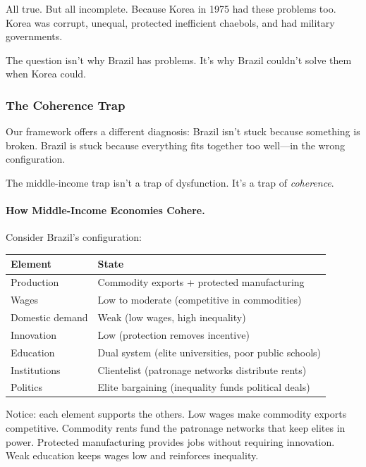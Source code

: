All true. But all incomplete. Because Korea in 1975 had these problems too. 
Korea was corrupt, unequal, protected inefficient chaebols, and had 
military governments.

The question isn't why Brazil has problems. It's why Brazil couldn't 
solve them when Korea could.

\subsubsection{The Coherence Trap}

Our framework offers a different diagnosis: Brazil isn't stuck because 
something is broken. Brazil is stuck because everything fits together 
too well---in the wrong configuration.

The middle-income trap isn't a trap of dysfunction. It's a trap of 
\emph{coherence}.

\paragraph{How Middle-Income Economies Cohere.}

Consider Brazil's configuration:

\begin{center}
\renewcommand{\arraystretch}{1.3}
\begin{tabular}{ll}
\hline
\textbf{Element} & \textbf{State} \\
\hline
Production & Commodity exports + protected manufacturing \\
Wages & Low to moderate (competitive in commodities) \\
Domestic demand & Weak (low wages, high inequality) \\
Innovation & Low (protection removes incentive) \\
Education & Dual system (elite universities, poor public schools) \\
Institutions & Clientelist (patronage networks distribute rents) \\
Politics & Elite bargaining (inequality funds political deals) \\
\hline
\end{tabular}
\end{center}

Notice: each element supports the others. Low wages make commodity exports 
competitive. Commodity rents fund the patronage networks that keep elites 
in power. Protected manufacturing provides jobs without requiring innovation. 
Weak education keeps wages low and reinforces inequality.

